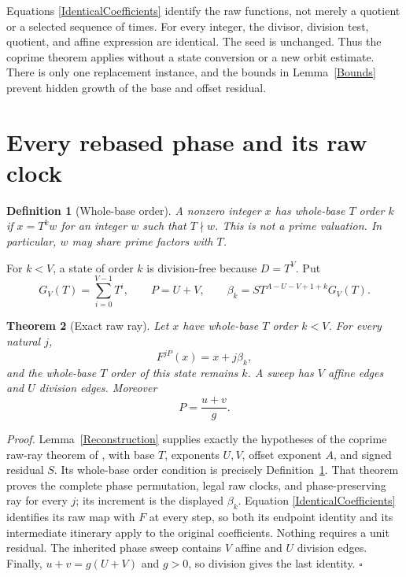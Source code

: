 \documentclass[11pt,letterpaper]{article}
\newtheorem{theorem}{Theorem}
\newtheorem{definition}[theorem]{Definition}
\newenvironment{proof}{\noindent\textit{Proof.}}{\hfill\(\square\)}
\begin{document}
Equations \eqref{IdenticalCoefficients} identify the raw functions, not merely
a quotient or a selected sequence of times. For every integer, the divisor,
division test, quotient, and affine expression are identical. The seed is
unchanged. Thus the coprime theorem applies without a state conversion or a
new orbit estimate. There is only one replacement instance, and the bounds
in Lemma~\ref{Bounds} prevent hidden growth of the base and offset residual.

\section{Every rebased phase and its raw clock}

\begin{definition}[Whole-base order]\label{Order}
A nonzero integer \(x\) has whole-base \(T\) order \(k\) if
\(x=T^k w\) for an integer \(w\) such that \(T\nmid w\).
This is not a prime valuation. In particular, \(w\) may share prime factors
with \(T\).
\end{definition}

For \(k<V\), a state of order \(k\) is division-free because \(D=T^V\).
Put
\[
G_V(T)=\sum_{i=0}^{V-1}T^i,\qquad
P=U+V,\qquad
\beta_k=S T^{A-U-V+1+k}G_V(T).
\]

\begin{theorem}[Exact raw ray]\label{RawRay}
Let \(x\) have whole-base \(T\) order \(k<V\).
For every natural \(j\),
\[
F^{jP}(x)=x+j\beta_k,
\]
and the whole-base \(T\) order of this state remains \(k\).
A sweep has \(V\) affine edges and \(U\) division edges.
Moreover
\[
P=\frac{u+v}{g}.
\]
\end{theorem}

\begin{proof}
Lemma~\ref{Reconstruction} supplies exactly the hypotheses of the coprime
raw-ray theorem of \cite{AscendCommonBase}, with base \(T\), exponents \(U,V\),
offset exponent \(A\), and signed residual \(S\). Its whole-base order
condition is precisely Definition~\ref{Order}. That theorem proves the complete
phase permutation, legal raw clocks, and phase-preserving ray for every
\(j\); its increment is the displayed \(\beta_k\).
Equation \eqref{IdenticalCoefficients} identifies its raw map with \(F\) at
every step, so both its endpoint identity and its intermediate itinerary
apply to the original coefficients. Nothing requires a unit residual.
The inherited phase sweep contains \(V\) affine and \(U\) division edges.
Finally, \(u+v=g(U+V)\) and \(g>0\), so division gives the last identity.
\end{proof}
\end{document}
